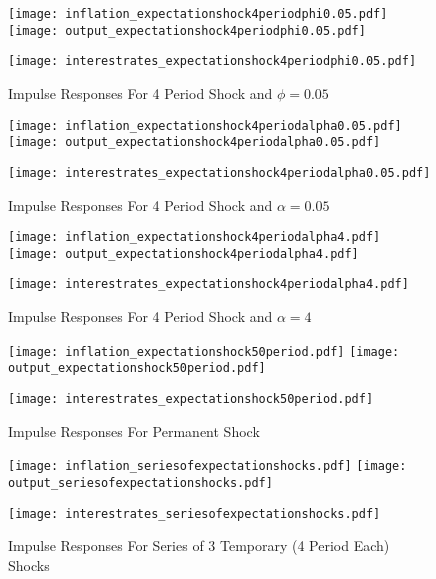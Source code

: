 \documentclass[12pt]{article}
\newcommand{\1}{\mathbbm 1}
\begin{document}
\begin{figure}[H]
	\texttt{[image: inflation\_expectationshock4periodphi0.05.pdf]}
	\hfill
	\texttt{[image: output\_expectationshock4periodphi0.05.pdf]}
	\hfill
	\begin{Center}
		\texttt{[image: interestrates\_expectationshock4periodphi0.05.pdf]}
	\end{Center}
	\caption{Impulse Responses For 4 Period Shock and $\phi = 0.05$}
\end{figure}

\begin{figure}[H]
	\texttt{[image: inflation\_expectationshock4periodalpha0.05.pdf]}
	\hfill
	\texttt{[image: output\_expectationshock4periodalpha0.05.pdf]}
	\hfill
	\begin{Center}
		\texttt{[image: interestrates\_expectationshock4periodalpha0.05.pdf]}
	\end{Center}
	\caption{Impulse Responses For 4 Period Shock and $\alpha = 0.05$}
\end{figure}


\begin{figure}[H]
	\texttt{[image: inflation\_expectationshock4periodalpha4.pdf]}
	\hfill
	\texttt{[image: output\_expectationshock4periodalpha4.pdf]}
	\hfill
	\begin{Center}
		\texttt{[image: interestrates\_expectationshock4periodalpha4.pdf]}
	\end{Center}
	\caption{Impulse Responses For 4 Period Shock and $\alpha = 4$}
\end{figure}
	
	\begin{figure}[H]
		\texttt{[image: inflation\_expectationshock50period.pdf]}
		\hfill
		\texttt{[image: output\_expectationshock50period.pdf]}
		\hfill
		\begin{Center}
			\texttt{[image: interestrates\_expectationshock50period.pdf]}
		\end{Center}
		\caption{Impulse Responses For Permanent Shock}
	\end{figure}


	\begin{figure}[H]
	\texttt{[image: inflation\_seriesofexpectationshocks.pdf]}
	\hfill
	\texttt{[image: output\_seriesofexpectationshocks.pdf]}
	\hfill
	\begin{Center}
		\texttt{[image: interestrates\_seriesofexpectationshocks.pdf]}
	\end{Center}
	\caption{Impulse Responses For Series of 3 Temporary (4 Period Each) Shocks}
\end{figure}
		
\end{document}
